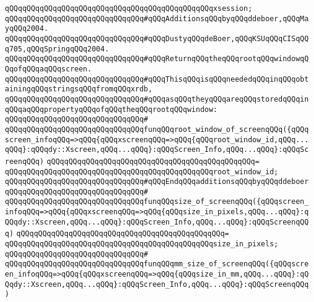\verb|qQQqqQQqqQQqqQQqqQQqqQQqqQQqqQQqqQQqqQQqqQQqqQQqxsession;|\newline
\newline
\verb|qQQqqQQqqQQqqQQqqQQqqQQqqQQqqQQq#qQQqAdditionsqQQqbyqQQqddeboer,qQQqMayqQQq2004.|\newline
\verb|qQQqqQQqqQQqqQQqqQQqqQQqqQQqqQQq#qQQqDustyqQQqdeBoer,qQQqKSUqQQqCISqQQq705,qQQqSpringqQQq2004.|\newline
\newline
\verb|qQQqqQQqqQQqqQQqqQQqqQQqqQQqqQQq#qQQqReturnqQQqtheqQQqrootqQQqwindowqQQqofqQQqaqQQqscreen.|\newline
\verb|qQQqqQQqqQQqqQQqqQQqqQQqqQQqqQQq#qQQqThisqQQqisqQQqneededqQQqinqQQqobtainingqQQqstringsqQQqfromqQQqxrdb,|\newline
\verb|qQQqqQQqqQQqqQQqqQQqqQQqqQQqqQQq#qQQqasqQQqtheyqQQqareqQQqstoredqQQqinqQQqaqQQqpropertyqQQqofqQQqtheqQQqrootqQQqwindow:|\newline
\verb|qQQqqQQqqQQqqQQqqQQqqQQqqQQqqQQq#|\newline
\verb|qQQqqQQqqQQqqQQqqQQqqQQqqQQqqQQqfunqQQqroot_window_of_screenqQQq({qQQqscreen_infoqQQq=>qQQq{qQQqxscreenqQQq=>qQQq{qQQqroot_window_id,qQQq...qQQq}:qQQqdy::Xscreen,qQQq...qQQq}:qQQqScreen_Info,qQQq...qQQq}:qQQqScreenqQQq)|\newline
\verb|qQQqqQQqqQQqqQQqqQQqqQQqqQQqqQQqqQQqqQQqqQQqqQQq=|\newline
\verb|qQQqqQQqqQQqqQQqqQQqqQQqqQQqqQQqqQQqqQQqqQQqqQQqroot_window_id;|\newline
\newline
\verb|qQQqqQQqqQQqqQQqqQQqqQQqqQQqqQQq#qQQqEndqQQqadditionsqQQqbyqQQqddeboer|\newline
\verb|qQQqqQQqqQQqqQQqqQQqqQQqqQQqqQQq#|\newline
\verb|qQQqqQQqqQQqqQQqqQQqqQQqqQQqqQQqfunqQQqsize_of_screenqQQq({qQQqscreen_infoqQQq=>qQQq{qQQqxscreenqQQq=>qQQq{qQQqsize_in_pixels,qQQq...qQQq}:qQQqdy::Xscreen,qQQq...qQQq}:qQQqScreen_Info,qQQq...qQQq}:qQQqScreenqQQq)|\newline
\verb|qQQqqQQqqQQqqQQqqQQqqQQqqQQqqQQqqQQqqQQqqQQqqQQq=|\newline
\verb|qQQqqQQqqQQqqQQqqQQqqQQqqQQqqQQqqQQqqQQqqQQqqQQqsize_in_pixels;|\newline
\verb|qQQqqQQqqQQqqQQqqQQqqQQqqQQqqQQq#|\newline
\verb|qQQqqQQqqQQqqQQqqQQqqQQqqQQqqQQqfunqQQqmm_size_of_screenqQQq({qQQqscreen_infoqQQq=>qQQq{qQQqxscreenqQQq=>qQQq{qQQqsize_in_mm,qQQq...qQQq}:qQQqdy::Xscreen,qQQq...qQQq}:qQQqScreen_Info,qQQq...qQQq}:qQQqScreenqQQq)|\newline
